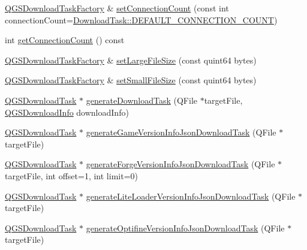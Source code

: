 \begin{DoxyCompactItemize}
\item 
\mbox{\hyperlink{class_q_g_s_download_task_factory}{Q\+G\+S\+Download\+Task\+Factory}} \& \mbox{\hyperlink{class_q_g_s_download_task_factory_a404eb0b130ade22e8db4a5b64e1882bd}{set\+Connection\+Count}} (const int connection\+Count=\mbox{\hyperlink{namespace_download_task_aaa57d3178f399d1c5ba47d41cd38bb8e}{Download\+Task\+::\+D\+E\+F\+A\+U\+L\+T\+\_\+\+C\+O\+N\+N\+E\+C\+T\+I\+O\+N\+\_\+\+C\+O\+U\+NT}})
\item 
int \mbox{\hyperlink{class_q_g_s_download_task_factory_a1e9feb18ce144e6aa2571cecb5ac1cd3}{get\+Connection\+Count}} () const
\item 
\mbox{\hyperlink{class_q_g_s_download_task_factory}{Q\+G\+S\+Download\+Task\+Factory}} \& \mbox{\hyperlink{class_q_g_s_download_task_factory_a62af99042d394d89b3d778dfff4974e8}{set\+Large\+File\+Size}} (const quint64 bytes)
\item 
\mbox{\hyperlink{class_q_g_s_download_task_factory}{Q\+G\+S\+Download\+Task\+Factory}} \& \mbox{\hyperlink{class_q_g_s_download_task_factory_abf94d693d3bb16676997f3e0c5a978d0}{set\+Small\+File\+Size}} (const quint64 bytes)
\item 
\mbox{\hyperlink{class_q_g_s_download_task}{Q\+G\+S\+Download\+Task}} $\ast$ \mbox{\hyperlink{class_q_g_s_download_task_factory_a237d924f9a9bec548cb8154ed8c7bb97}{generate\+Download\+Task}} (Q\+File $\ast$target\+File, \mbox{\hyperlink{class_q_g_s_download_info}{Q\+G\+S\+Download\+Info}} download\+Info)
\item 
\mbox{\hyperlink{class_q_g_s_download_task}{Q\+G\+S\+Download\+Task}} $\ast$ \mbox{\hyperlink{class_q_g_s_download_task_factory_a8c9b439fab4e9c811c8b365858a69922}{generate\+Game\+Version\+Info\+Json\+Download\+Task}} (Q\+File $\ast$target\+File)
\item 
\mbox{\hyperlink{class_q_g_s_download_task}{Q\+G\+S\+Download\+Task}} $\ast$ \mbox{\hyperlink{class_q_g_s_download_task_factory_aa4ca356202f7684fca15d406458be232}{generate\+Forge\+Version\+Info\+Json\+Download\+Task}} (Q\+File $\ast$target\+File, int offset=1, int limit=0)
\item 
\mbox{\hyperlink{class_q_g_s_download_task}{Q\+G\+S\+Download\+Task}} $\ast$ \mbox{\hyperlink{class_q_g_s_download_task_factory_abc9b7f7657b8512b5a23cc5e9ed0c4be}{generate\+Lite\+Loader\+Version\+Info\+Json\+Download\+Task}} (Q\+File $\ast$target\+File)
\item 
\mbox{\hyperlink{class_q_g_s_download_task}{Q\+G\+S\+Download\+Task}} $\ast$ \mbox{\hyperlink{class_q_g_s_download_task_factory_a0261ac880c78cc2d75f300d4bd25dc38}{generate\+Optifine\+Version\+Info\+Json\+Download\+Task}} (Q\+File $\ast$target\+File)

\end{DoxyCompactItemize}
